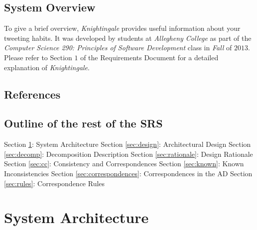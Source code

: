 \documentclass[a4paper, 12pt]{article}
\begin{document}
\subsection{System Overview} \label{sec:view}
\begin{adjustwidth}{2em}{0pt}
To give a brief overview, \textit{Knightingale} provides useful information about your tweeting habits. It was developed by students at \textit{Allegheny College} as part of the \textit{Computer Science 290: Principles of Software Development} class in \textit{Fall} of $2013$. Please refer to Section $1$ of the Requirements Document for a detailed explanation of \textit{Knightingale}. \newline
\end{adjustwidth}

\subsection{References} \label{sec:ref}
\begin{adjustwidth}{2em}{0pt}

\end{adjustwidth}

\subsection{Outline of the rest of the SRS} \label{sec:outline}
\begin{adjustwidth}{2em}{0pt}
Section \ref{sec:arch}: System Architecture \newline
Section \ref{sec:design}: Architectural Design \newline
Section \ref{sec:decomp}: Decomposition Description \newline
Section \ref{sec:rationale}: Design Rationale \newline
Section \ref{sec:cc}: Consistency and Correspondences \newline
Section \ref{sec:known}: Known Inconsistencies \newline
Section \ref{sec:correspondences}: Correspondences in the AD \newline
Section \ref{sec:rules}: Correspondence Rules \newline
\end{adjustwidth}

\section{System Architecture} \label{sec:arch}
\end{document}

